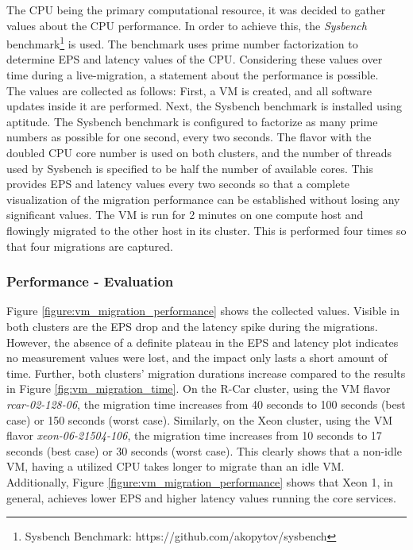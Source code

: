             \noindent The \ac{CPU} being the primary computational resource, it was decided to gather values about the \ac{CPU} performance.
            In order to achieve this, the \textsl{Sysbench} benchmark\footnote{Sysbench Benchmark: https://github.com/akopytov/sysbench} is used.
            The benchmark uses prime number factorization to determine \ac{EPS} and latency values of the \ac{CPU}.
            Considering these values over time during a live-migration, a statement about the performance is possible.\\
            The values are collected as follows:
            First, a \ac{VM} is created, and all software updates inside it are performed.
            Next, the Sysbench benchmark is installed using aptitude.
            The Sysbench benchmark is configured to factorize as many prime numbers as possible for one second, every two seconds.
            The flavor with the doubled \ac{CPU} core number is used on both clusters, and the number of threads used by Sysbench is specified to be half the number of available cores.
            This provides \ac{EPS} and latency values every two seconds so that a complete visualization of the migration performance can be established without losing any significant values.
            The \ac{VM} is run for 2 minutes on one compute host and flowingly migrated to the other host in its cluster.
            This is performed four times so that four migrations are captured.
        
        
        \subsubsection*{Performance - Evaluation}

            \noindent Figure \ref{figure:vm_migration_performance} shows the collected values.
            Visible in both clusters are the \ac{EPS} drop and the latency spike during the migrations.
            However, the absence of a definite plateau in the \ac{EPS} and latency plot indicates no measurement values were lost, and the impact only lasts a short amount of time.
            Further, both clusters' migration durations increase compared to the results in Figure \ref{fig:vm_migration_time}.
            On the R-Car cluster, using the \ac{VM} flavor \textsl{rcar-02-128-06}, the migration time increases from 40 seconds to 100 seconds (best case) or 150 seconds (worst case).
            Similarly, on the Xeon cluster, using the \ac{VM} flavor \textsl{xeon-06-21504-106}, the migration time increases from 10 seconds to 17 seconds (best case) or 30 seconds (worst case).
            This clearly shows that a non-idle \ac{VM}, having a utilized \ac{CPU} takes longer to migrate than an idle \ac{VM}.
            Additionally, Figure \ref{figure:vm_migration_performance} shows that Xeon 1, in general, achieves lower EPS and higher latency values running the core services.
            
